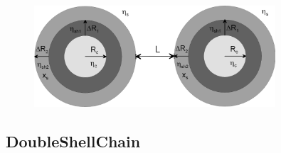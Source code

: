 \begin{figure}[htb]
\begin{center}
\includegraphics[width=0.8\textwidth]{../images/form_factor/cluster/l_doubleshell.png}
\end{center}
\caption{} \label{DumbbellShell}
\end{figure}


\clearpage
\subsection{DoubleShellChain}
\label{sect:DoubleShellChain}
~\\

